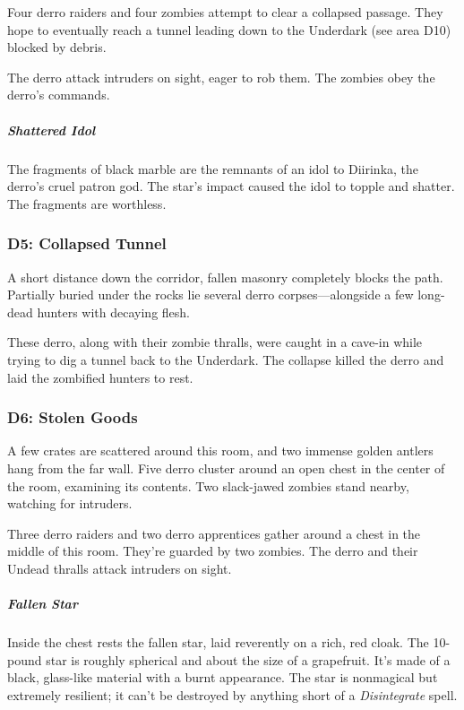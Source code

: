 \documentclass[10pt,a4paper,twoside,bg=print,twocolumn,openany,nodeprecatedcode]{dndbook}
\begin{document}
Four derro raiders and four zombies attempt to clear a collapsed passage. They hope to eventually reach a tunnel leading down to the Underdark (see area D10) blocked by debris.

The derro attack intruders on sight, eager to rob them. The zombies obey the derro's commands.

\subparagraph{Shattered Idol}
The fragments of black marble are the remnants of an idol to Diirinka, the derro's cruel patron god. The star's impact caused the idol to topple and shatter. The fragments are worthless.

\subsubsection{D5: Collapsed Tunnel}
\begin{DndReadAloud}{}
A short distance down the corridor, fallen masonry completely blocks the path. Partially buried under the rocks lie several derro corpses—alongside a few long-dead hunters with decaying flesh.

\end{DndReadAloud}

These derro, along with their zombie thralls, were caught in a cave-in while trying to dig a tunnel back to the Underdark. The collapse killed the derro and laid the zombified hunters to rest.

\subsubsection{D6: Stolen Goods}
\begin{DndReadAloud}{}
A few crates are scattered around this room, and two immense golden antlers hang from the far wall. Five derro cluster around an open chest in the center of the room, examining its contents. Two slack-jawed zombies stand nearby, watching for intruders.

\end{DndReadAloud}

Three derro raiders and two derro apprentices gather around a chest in the middle of this room. They're guarded by two zombies. The derro and their Undead thralls attack intruders on sight.

\subparagraph{Fallen Star}
Inside the chest rests the fallen star, laid reverently on a rich, red cloak. The 10-pound star is roughly spherical and about the size of a grapefruit. It's made of a black, glass-like material with a burnt appearance. The star is nonmagical but extremely resilient; it can't be destroyed by anything short of a \textit{Disintegrate} spell.
\end{document}
